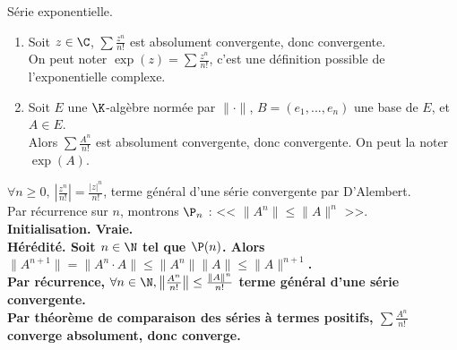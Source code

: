 \documentclass[11pt]{article}
\begin{document}
\begin{prop}{Série exponentielle.}{}
    \begin{enumerate}
        \item Soit $z\in\C$, $\sum\frac{z^n}{n!}$ est absolument convergente, donc convergente.\\
        On peut noter $\exp(z)=\sum\frac{z^n}{n!}$, c'est une définition possible de l'exponentielle complexe.
        \item Soit $E$ une $\K$-algèbre normée par $\|\cdot\|$, $B=(e_1,...,e_n)$ une base de $E$, et $A\in E$.\\
            Alors $\sum\frac{A^n}{n!}$ est absolument convergente, donc convergente. On peut la noter $\exp(A)$.
    \end{enumerate}
    \tcblower
     $\forall n \geq 0, ~ \left|\frac{z^n}{n!}\right| = \frac{|z|^n}{n!}$, terme général d'une série convergente par D'Alembert.\\
     Par récurrence sur $n$, montrons $\P_n$ : << $\|A^n\|\leq\|A\|^n$ >>.\\
    \bf{Initialisation.} Vraie.\\
    \bf{Hérédité.} Soit $n\in\N$ tel que $\P(n)$. Alors $\|A^{n+1}\|=\|A^n\cdot A\|\leq\|A^n\|\|A\|\leq \|A\|^{n+1}$.\\
    Par récurrence, $\forall n \in \N, \left\|\frac{A^n}{n!}\right\| \leq \frac{\|A\|^n}{n!}$ terme général d'une série convergente.\\
    Par théorème de comparaison des séries à \bf{termes positifs}, $\sum\frac{A^n}{n!}$ converge absolument, donc converge.
\end{prop}
\end{document}
